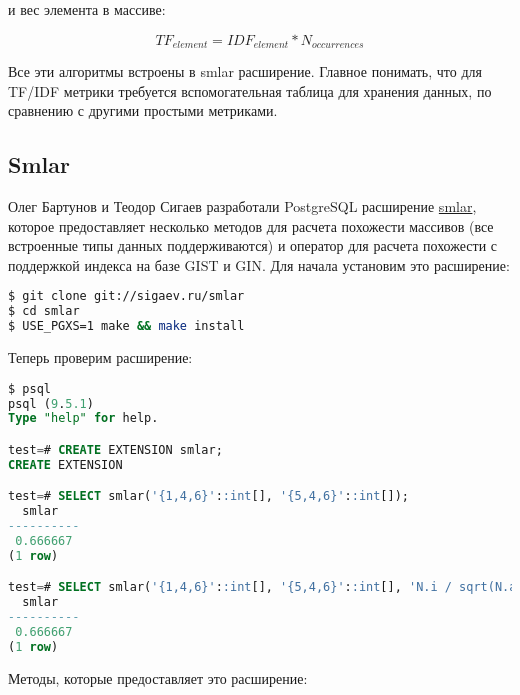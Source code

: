 и вес элемента в массиве:

\begin{equation}
 \label{eq:smlar6}
 TF_{element} = IDF_{element} * N_{occurrences}
\end{equation}

Все эти алгоритмы встроены в smlar расширение. Главное понимать, что для TF/IDF метрики требуется вспомогательная таблица для хранения данных, по сравнению с другими простыми метриками.

\subsection{Smlar}

Олег Бартунов и Теодор Сигаев разработали PostgreSQL расширение \href{http://sigaev.ru/git/gitweb.cgi?p=smlar.git;a=blob;hb=HEAD;f=README}{smlar}, которое предоставляет несколько методов для расчета похожести массивов (все встроенные типы данных поддерживаются) и оператор для расчета похожести с поддержкой индекса на базе GIST и GIN. Для начала установим это расширение:

\begin{lstlisting}[language=Bash,label=lst:smlar1,caption=Установка smlar]
$ git clone git://sigaev.ru/smlar
$ cd smlar
$ USE_PGXS=1 make && make install
\end{lstlisting}

Теперь проверим расширение:

\begin{lstlisting}[language=SQL,label=lst:smlar4,caption=Проверка smlar]
$ psql
psql (9.5.1)
Type "help" for help.

test=# CREATE EXTENSION smlar;
CREATE EXTENSION

test=# SELECT smlar('{1,4,6}'::int[], '{5,4,6}'::int[]);
  smlar
----------
 0.666667
(1 row)

test=# SELECT smlar('{1,4,6}'::int[], '{5,4,6}'::int[], 'N.i / sqrt(N.a * N.b)' );
  smlar
----------
 0.666667
(1 row)
\end{lstlisting}

Методы, которые предоставляет это расширение:

